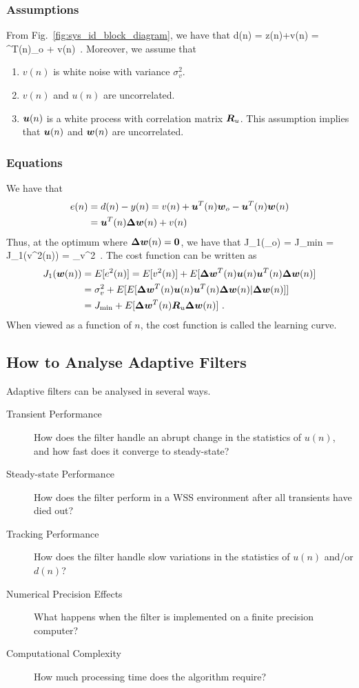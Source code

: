 \subsubsection{Assumptions}
From Fig.~\ref{fig:sys_id_block_diagram}, we have that
\bmath
  d(n) = z(n)+v(n) = ^T(n)_o + v(n)\ .
\emath
Moreover, we assume that
\begin{enumerate}
  \item $v(n)$ is white noise with variance $\sigma_v^2$.
  \item $v(n)$ and $u(n)$ are uncorrelated.
  \item $\boldsymbol{u}(n)$ is a white process with correlation matrix $\boldsymbol{R}_u$. This assumption implies that $\boldsymbol{u}(n)$ and $\boldsymbol{w}(n)$ are uncorrelated.
\end{enumerate}
\subsubsection{Equations}
We have that
  \begin{align}
    e(n) &= d(n) - y(n) =  v(n) + \boldsymbol{u}^T(n)\boldsymbol{w}_o - \boldsymbol{u}^T(n)\boldsymbol{w}(n)\\
         &= \boldsymbol{u}^T(n)\boldsymbol{\Delta}\boldsymbol{w}(n)+ v(n)
  \end{align}
Thus, at the optimum where $\boldsymbol{\Delta}\boldsymbol{w}(n)=\boldsymbol{0}$, we have that
\bmath
  J_1(_o) = J_\textup{min} = J_1(v^2(n)) = \sigma_v^2\ .
\emath
The cost function can be written as
\begin{align}
  J_1(\boldsymbol{w}(n)) &= E[e^2(n)] = E[v^2(n)] + E[\boldsymbol{\Delta}\boldsymbol{w}^T(n)\boldsymbol{u}(n)\boldsymbol{u}^T(n)\boldsymbol{\Delta}\boldsymbol{w}(n)]\notag\\
  &= \sigma_v^2 + E[E[\boldsymbol{\Delta}\boldsymbol{w}^T(n)\boldsymbol{u}(n)\boldsymbol{u}^T(n)\boldsymbol{\Delta}\boldsymbol{w}(n)|\boldsymbol{\Delta}\boldsymbol{w}(n)]]\notag\\
  &= J_\textup{min} + E[\boldsymbol{\Delta}\boldsymbol{w}^T(n)\boldsymbol{R}_u\boldsymbol{\Delta}\boldsymbol{w}(n)]\ .
\end{align}
When viewed as a function of $n$, the cost function is called the learning curve.

\subsection{How to Analyse Adaptive Filters}
Adaptive filters can be analysed in several ways.
\begin{description}
  \item[Transient Performance] How does the filter handle an abrupt change in the statistics of $u(n)$, and how fast does it converge to steady-state?
  \item[Steady-state Performance] How does the filter perform in a WSS environment after all transients have died out?
  \item[Tracking Performance] How does the filter handle slow variations in the statistics of $u(n)$ and/or $d(n)$?
  \item[Numerical Precision Effects] What happens when the filter is implemented on a finite precision computer?
  \item[Computational Complexity] How much processing time does the algorithm require?
\end{description}
